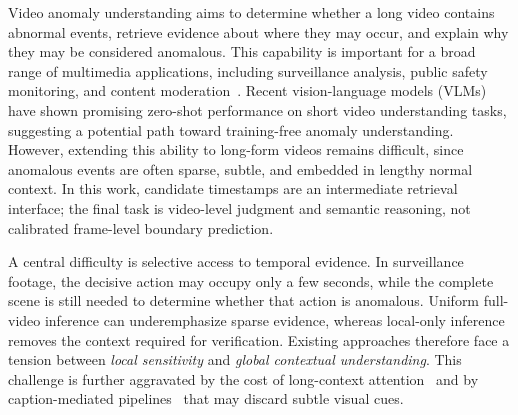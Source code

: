 
Video anomaly understanding aims to determine whether a long video contains abnormal events, retrieve evidence about where they may occur, and explain why they may be considered anomalous. This capability is important for a broad range of multimedia applications, including surveillance analysis, public safety monitoring, and content moderation~\cite{sultani2018real}. Recent vision-language models (VLMs)~\cite{radford2021learning,zhai2023sigmoid} have shown promising zero-shot performance on short video understanding tasks, suggesting a potential path toward training-free anomaly understanding. However, extending this ability to long-form videos remains difficult, since anomalous events are often sparse, subtle, and embedded in lengthy normal context. In this work, candidate timestamps are an intermediate retrieval interface; the final task is video-level judgment and semantic reasoning, not calibrated frame-level boundary prediction.


A central difficulty is selective access to temporal evidence. In surveillance footage, the decisive action may occupy only a few seconds, while the complete scene is still needed to determine whether that action is anomalous. Uniform full-video inference can underemphasize sparse evidence, whereas local-only inference removes the context required for verification. Existing approaches therefore face a tension between \textit{local sensitivity} and \textit{global contextual understanding}. This challenge is further aggravated by the cost of long-context attention~\cite{vaswani2017attention} and by caption-mediated pipelines~\cite{zanella2024harnessing} that may discard subtle visual cues.

